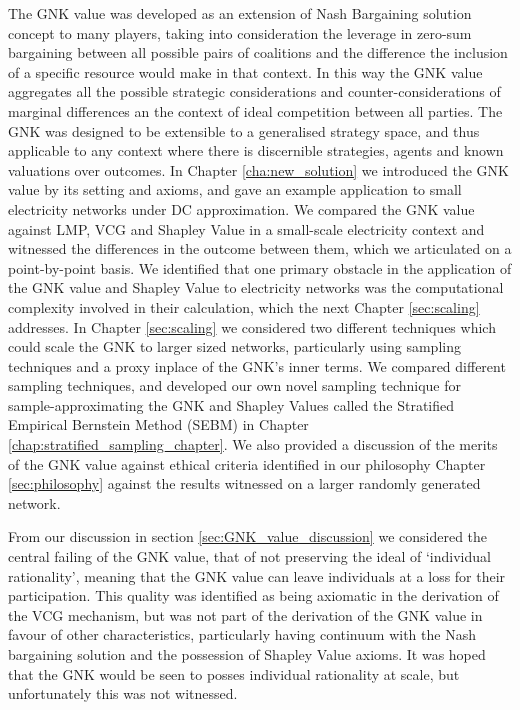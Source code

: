 The GNK value was developed as an extension of Nash Bargaining solution concept to many players, taking into consideration the leverage in zero-sum bargaining between all possible pairs of coalitions and the difference the inclusion of a specific resource would make in that context.
In this way the GNK value aggregates all the possible strategic considerations and counter-considerations of marginal differences an the context of ideal competition between all parties.
The GNK was designed to be extensible to a generalised strategy space, and thus applicable to any context where there is discernible strategies, agents and known valuations over outcomes. 
In Chapter \ref{cha:new_solution} we introduced the GNK value by its setting and axioms, and gave an example application to small electricity networks under DC approximation.
We compared the GNK value against LMP, VCG and Shapley Value in a small-scale electricity context and witnessed the differences in the outcome between them, which we articulated on a point-by-point basis.
We identified that one primary obstacle in the application of the GNK value and Shapley Value to electricity networks was the computational complexity involved in their calculation, which the next Chapter \ref{sec:scaling} addresses.
In Chapter \ref{sec:scaling} we considered two different techniques which could scale the GNK to larger sized networks, particularly using sampling techniques and a proxy inplace of the GNK's inner terms.
We compared different sampling techniques, and developed our own novel sampling technique for sample-approximating the GNK and Shapley Values called the Stratified Empirical Bernstein Method (SEBM) in Chapter \ref{chap:stratified_sampling_chapter}.
We also provided a discussion of the merits of the GNK value against ethical criteria identified in our philosophy Chapter \ref{sec:philosophy} against the results witnessed on a larger randomly generated network.

From our discussion in section \ref{sec:GNK_value_discussion} we considered the central failing of the GNK value, that of not preserving the ideal of `individual rationality', meaning that the GNK value can leave individuals at a loss for their participation.
This quality was identified as being axiomatic in the derivation of the VCG mechanism, but was not part of the derivation of the GNK value in favour of other characteristics, particularly having continuum with the Nash bargaining solution and the possession of Shapley Value axioms.
It was hoped that the GNK would be seen to posses individual rationality at scale, but unfortunately this was not witnessed.

